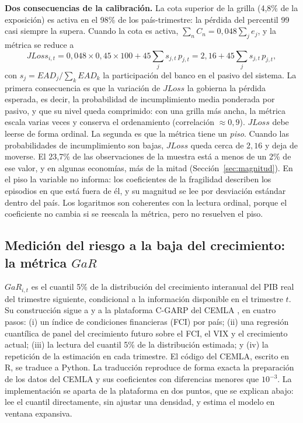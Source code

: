 \noindent\textbf{Dos consecuencias de la calibración.} La cota superior de la grilla (4,8\% de la exposición) es activa en el 98\% de los país-trimestre: la pérdida del percentil 99 casi siempre la supera. Cuando la cota es activa, $\sum_nC_n=0{,}048\sum_je_j$, y la métrica se reduce a
\[ JLoss_{i,t}=0{,}048\times0{,}45\times100+45\sum_j s_{j,t}\,p_{j,t}=2{,}16+45\sum_j s_{j,t}\,p_{j,t}, \]
con $s_j=EAD_j/\sum_kEAD_k$ la participación del banco en el pasivo del sistema. La primera consecuencia es que la variación de $JLoss$ la gobierna la pérdida esperada, es decir, la probabilidad de incumplimiento media ponderada por pasivo, y que su nivel queda comprimido: con una grilla más ancha, la métrica escala varias veces y conserva el ordenamiento (correlación $\approx0{,}9$). $JLoss$ debe leerse de forma ordinal. La segunda es que la métrica tiene un \emph{piso}. Cuando las probabilidades de incumplimiento son bajas, $JLoss$ queda cerca de $2{,}16$ y deja de moverse. El 23,7\% de las observaciones de la muestra está a menos de un 2\% de ese valor, y en algunas economías, más de la mitad (Sección~\ref{sec:magnitud}). En el piso la variable no informa: los coeficientes de la fragilidad describen los episodios en que está fuera de él, y su magnitud se lee por desviación estándar dentro del país. Los logaritmos son coherentes con la lectura ordinal, porque el coeficiente no cambia si se reescala la métrica, pero no resuelven el piso.

\subsection{Medición del riesgo a la baja del crecimiento: la métrica \texorpdfstring{$GaR$}{GaR}}
\label{sec:gar}

$GaR_{i,t}$ es el cuantil 5\% de la distribución del crecimiento interanual del PIB real del trimestre siguiente, condicional a la información disponible en el trimestre $t$. Su construcción sigue a \citet{ABG2019b} y a la plataforma C-GARP del CEMLA \citep{OssandonBusch2022}, en cuatro pasos: (i) un índice de condiciones financieras (FCI) por país; (ii) una regresión cuantílica de panel del crecimiento futuro sobre el FCI, el VIX y el crecimiento actual; (iii) la lectura del cuantil 5\% de la distribución estimada; y (iv) la repetición de la estimación en cada trimestre. El código del CEMLA, escrito en R, se traduce a Python. La traducción reproduce de forma exacta la preparación de los datos del CEMLA y sus coeficientes con diferencias menores que $10^{-3}$. La implementación se aparta de la plataforma en dos puntos, que se explican abajo: lee el cuantil directamente, sin ajustar una densidad, y estima el modelo en ventana expansiva.

